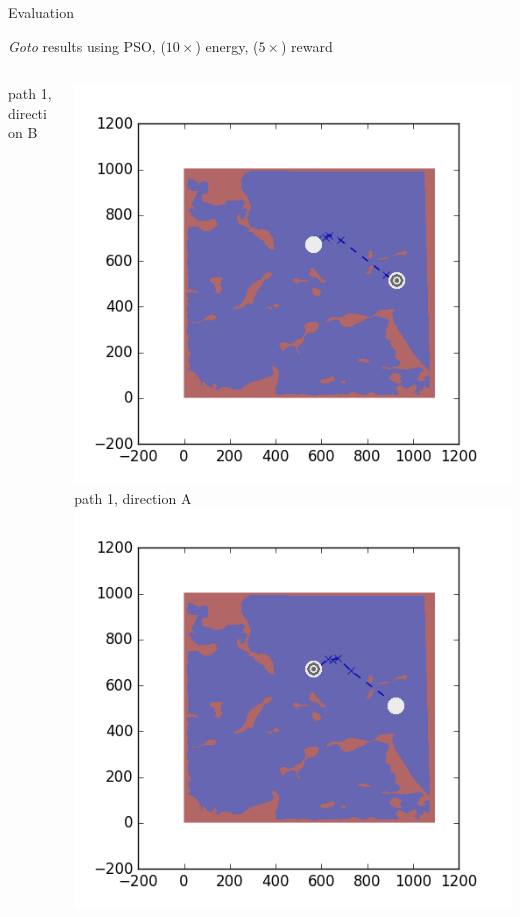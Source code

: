 \documentclass[9pt]{beamer}
\begin{document}
\begin{frame}{Evaluation}
\begin{block}{\textit{Goto} results using PSO, ($10\times$) energy, ($5\times$) reward}
\begin{columns}
\begin{column}{0.33\textwidth}
\begin{center}
                    \newline
                    \tiny{path 1, direction B}
                \end{center}
            \end{column}
            \begin{column}{0.33\textwidth}
                \begin{center}
                    \includegraphics[width=\textwidth,trim={2cm 2cm 2cm 2cm},clip]{img/EXP3RG_PathBa_-1_-1_0d01_0d005.png}
                    \newline
                    \tiny{path 1, direction A}
                    \newline
                    \includegraphics[width=\textwidth,trim={2cm 2cm 2cm 2cm},clip]{img/EXP3RG_PathBb_-1_-1_0d01_0d005.png}

\end{center}
\end{column}
\end{columns}
\end{block}
\end{frame}
\end{document}
